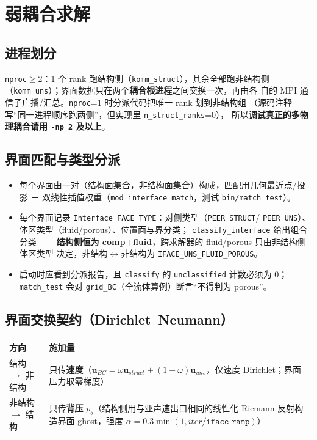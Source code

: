 \documentclass[11pt,a4paper]{ctexart}
\begin{document}
\section{弱耦合求解}\label{sec:coupling}

\subsection{进程划分}

\texttt{nproc}$\ge$2：1 个 rank 跑结构侧（\texttt{komm\_struct}），其余全部跑非结构侧
（\texttt{komm\_uns}）；界面数据只在两个\textbf{耦合根进程}之间交换一次，再由各
自的 MPI 通信子广播/汇总。\texttt{nproc}=1 时分派代码把唯一 rank 划到非结构组
（源码注释写``同一进程顺序跑两侧''，但实现里 \texttt{n\_struct\_ranks}=0），
所以\textbf{调试真正的多物理耦合请用 \texttt{-np 2} 及以上}。

\subsection{界面匹配与类型分派}

\begin{itemize}\itemsep2pt
  \item 每个界面由一对（结构面集合，非结构面集合）构成，匹配用几何最近点/投影 ＋
        双线性插值权重（\texttt{mod\_interface\_match}，测试 \texttt{bin/match\_test}）。
  \item 每个界面记录 \texttt{Interface\_FACE\_TYPE}：对侧类型（\texttt{PEER\_STRUCT}/
        \texttt{PEER\_UNS}）、体区类型（fluid/porous）、位置面与界分类；
        \texttt{classify\_interface} 给出组合分类——
        \textbf{结构侧恒为 comp+fluid}，跨求解器的 fluid/porous 只由非结构侧体区类型
        决定，非结构$\leftrightarrow$非结构为 \texttt{IFACE\_UNS\_FLUID\_POROUS}。
  \item 启动时应看到分派报告，且 \texttt{classify} 的 \texttt{unclassified} 计数必须为 0；
        \texttt{match\_test} 会对 \texttt{grid\_BC}（全流体算例）断言``不得判为 porous''。
\end{itemize}

\subsection{界面交换契约（Dirichlet--Neumann）}

\begin{center}\small
\begin{tabular}{@{}>{\raggedright\arraybackslash}p{}>{\raggedright\arraybackslash}p{}@{}}
\toprule
方向 & 施加量 \\
\midrule
结构 $\to$ 非结构 & 只传\textbf{速度}（$\mathbf{u}_{BC} = \omega\mathbf{u}_{struct} +
 (1-\omega)\mathbf{u}_{uns}$，仅速度 Dirichlet；界面压力取零梯度） \\
非结构 $\to$ 结构 & 只传\textbf{背压} $p_b$（结构侧用与亚声速出口相同的线性化
 Riemann 反射构造界面 ghost，强度 $\alpha=0.3\min(1, iter/\texttt{iface\_ramp})$） \\
\bottomrule
\end{tabular}
\end{center}
\end{document}
